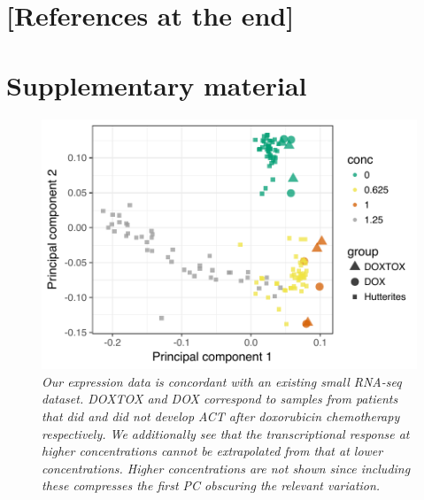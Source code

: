 \documentclass{article}
\begin{document}
{\section*{[References at the end]}
\newpage

%
%     

\setcounter{figure}{0}
\makeatletter 
\renewcommand{\thefigure}{S\@arabic\c@figure}

\section{Supplementary material} 

\begin{figure}[h]
\begin{center}
    \includegraphics[width=.6\textwidth]{../figures/burridge_comparison.pdf} %
    \caption{\it{Our expression data is concordant with an existing small RNA-seq dataset\citep{Burridge2016}. DOXTOX and DOX correspond to samples from patients that did and did not develop ACT after doxorubicin chemotherapy respectively. We additionally see that the transcriptional response at higher concentrations cannot be extrapolated from that at lower concentrations. Higher concentrations are not shown since including these compresses the first PC obscuring the relevant variation.}}
    \label{fig:burridge}
    \end{center}
\end{figure}

}
\end{document}
